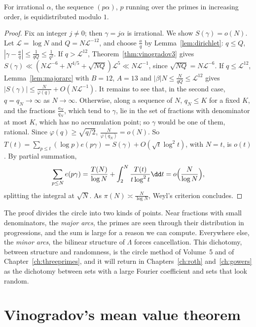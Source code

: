 \begin{corollary}[Vinogradov, 1937]\label{cor:palpha}
For irrational $\alpha$, the sequence $(p\alpha)$, $p$ running over the primes in increasing order, is equidistributed modulo $1$.
\end{corollary}
\begin{proof}
Fix an integer $j\ne0$; then $\gamma=j\alpha$ is irrational. We show $S(\gamma)=o(N)$. Let $\mathcal L=\log N$ and $Q=N\mathcal L^{-12}$, and choose $\frac aq$ by Lemma~\ref{lem:dirichlet}: $q\le Q$, $|\gamma-\frac aq|\le\frac1{qQ}\le\frac1{q^2}$. If $q>\mathcal L^{12}$, Theorem~\ref{thm:vinogradov3} gives $S(\gamma)\ll(N\mathcal L^{-6}+N^{4/5}+\sqrt{NQ})\mathcal L^5\ll N\mathcal L^{-1}$, since $\sqrt{NQ}=N\mathcal L^{-6}$. If $q\le\mathcal L^{12}$, Lemma~\ref{lem:majorarc} with $B=12$, $A=13$ and $|\beta|N\le\frac N{qQ}\le\mathcal L^{12}$ gives $|S(\gamma)|\le\frac N{\varphi(q)}+O(N\mathcal L^{-1})$.
It remains to see that, in the second case, $q=q_N\to\infty$ as $N\to\infty$. Otherwise, along a sequence of $N$, $q_N\le K$ for a fixed $K$, and the fractions $\frac{a_N}{q_N}$, which tend to $\gamma$, lie in the set of fractions with denominator at most $K$, which has no accumulation point; so $\gamma$ would be one of them, rational. Since $\varphi(q)\ge\sqrt{q/2}$, $\frac N{\varphi(q_N)}=o(N)$.
So $T(t)=\sum_{p\le t}(\log p)e(p\gamma)=S(\gamma)+O(\sqrt t\log^2t)$, with $N=t$, is $o(t)$. By partial summation,
\[
\sum_{p\le N}e(p\gamma)=\frac{T(N)}{\log N}+\int_2^N\frac{T(t)}{t\log^2t}\dd t=o\Bigl(\frac N{\log N}\Bigr),
\]
splitting the integral at $\sqrt N$. As $\pi(N)\asymp\frac N{\log N}$, Weyl's criterion concludes.
\end{proof}

\begin{beauty}
The proof divides the circle into two kinds of points. Near fractions with small denominators, the \emph{major arcs}, the primes are seen through their distribution in progressions, and the sum is large for a reason we can compute. Everywhere else, the \emph{minor arcs}, the bilinear structure of $\Lambda$ forces cancellation. This dichotomy, between structure and randomness, is the circle method of Volume~5 and of Chapter~\ref{ch:threeprimes}, and it will return in Chapters~\ref{ch:roth} and~\ref{ch:gowers} as the dichotomy between sets with a large Fourier coefficient and sets that look random.
\end{beauty}

\section{Vinogradov's mean value theorem}

